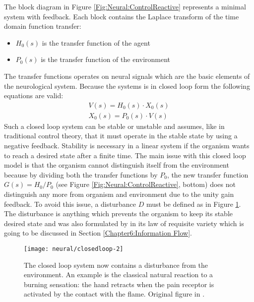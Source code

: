The block diagram in Figure \ref{Fig:Neural:ControlReactive} represents a minimal system with feedback.
Each block contains the Laplace transform of the time domain function transfer:
\begin{itemize}
 \item $H_0(s)$ is the transfer function of the agent
 \item $P_0(s)$ is the transfer function of the environment
\end{itemize}
The transfer functions operates on neural signals which are the basic elements
 of the neurological system.
Because the systems is in closed loop form the following equations are valid:
\begin{eqnarray*}
  V(s)= H_0(s) \cdot X_0(s)\\
  X_0(s)=P_0(s) \cdot V(s) 
\end{eqnarray*}
Such a closed loop system can be stable or unstable and \citep{VonFoerster85} assumes,
like in traditional control theory, that it must operate in the stable state by 
using a negative feedback.
Stability is necessary in a linear system if the organism wants to reach a desired
 state after a finite time.
The main issue with this closed loop model is that the organism cannot distinguish
 itself from the environment because by dividing both the transfer functions by $P_0$,
the new transfer function $G(s)=H_0/P_0$ (see Figure \ref{Fig:Neural:ControlReactive}, bottom) 
does not distinguish any more from organism and environment due to the unity gain feedback. 
To avoid this issue, a disturbance $D$ must be defined as in Figure \ref{Fig:Neural:ReactiveDisturbance}.
The disturbance is anything which prevents the organism to keep its stable desired state 
and was also formulated by \citep{Ashby1956:IntroCybernetics} in its law of requisite variety which is going to
 be discussed in Section \ref{Chapter6:Information Flow}.

\begin{figure}[htbp]
\begin{center}
\texttt{[image: neural/closedloop-2]}
\end{center}
\small{
\caption[Closed loop reactive system with disturbance]{
The closed loop system now contains a disturbance from the environment.
An example is the classical natural reaction to a burning sensation:
 the hand retracts when the pain receptor is activated by the contact
with the flame. Original figure in \citet{Porr2006cf}.
\label{Fig:Neural:ReactiveDisturbance}}}
\end{figure}

